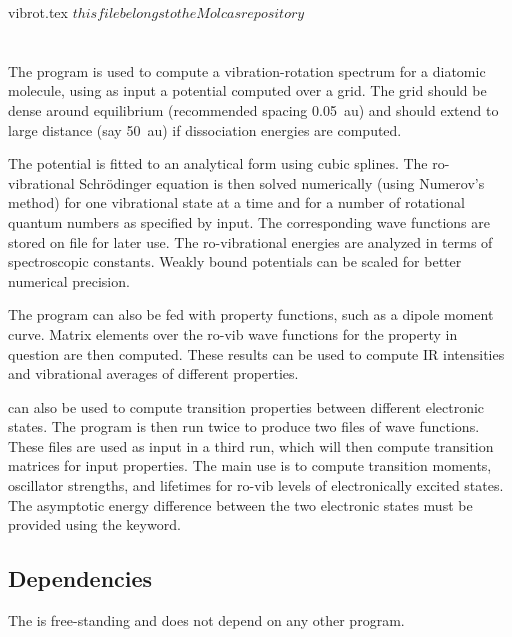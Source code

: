  vibrot.tex $ this file belongs to the Molcas repository $

\section{}
\label{UG:sec:vibrot}


The program  is used to compute a vibration-{}rotation
spectrum for a diatomic molecule, using as input a potential
computed over a grid. The grid should be dense around equilibrium (recommended
spacing 0.05~au) and should extend to large distance (say 50~au) if
dissociation energies are computed.

The potential is fitted to an analytical form using cubic splines. The
ro-{}vibrational Schr{\"o}dinger equation is then solved numerically
(using Numerov's method) for one vibrational state at a time and for a
number of rotational quantum numbers as specified by input. The
corresponding wave functions are stored on file
 for later use. The ro-{}vibrational energies
are analyzed in terms of spectroscopic constants. Weakly bound potentials can be
scaled for better numerical precision.

The program can also be fed with property functions, such as a dipole moment
curve. Matrix elements over the ro-{}vib wave functions for the property in
question are then computed. These results can be used to compute IR
intensities and vibrational averages of different properties.

 can also be used to compute transition properties between
different electronic states. The program is then run twice to produce two files
of wave functions. These files are used as input in a third run, which will
then compute transition matrices for input properties. The main use is to
compute transition moments, oscillator strengths, and lifetimes for ro-{}vib
levels of electronically excited states. The asymptotic energy difference
between the two electronic states must be provided using the 
keyword.

\subsection{Dependencies}
\label{UG:sec:vibrot_dependencies}
The  is free-standing and does not depend on any
other program.

